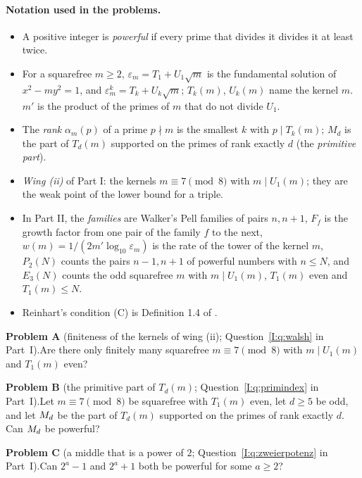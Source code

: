 %
\paragraph{Notation used in the problems.}
\begin{itemize}
\item A positive integer is \emph{powerful} if every prime that divides it divides it at least twice.
\item For a squarefree $m \ge 2$, $\varepsilon_m = T_1 + U_1 \sqrt{m}$ is the fundamental solution of $x^2 - m y^2 = 1$, and $\varepsilon_m^k = T_k + U_k \sqrt{m}$; $T_k(m)$, $U_k(m)$ name the kernel $m$. $m'$ is the product of the primes of $m$ that do not divide $U_1$.
\item The \emph{rank} $\alpha_m(p)$ of a prime $p \nmid m$ is the smallest $k$ with $p \mid T_k(m)$; $M_d$ is the part of $T_d(m)$ supported on the primes of rank exactly $d$ (the \emph{primitive part}).
\item \emph{Wing (ii)} of Part I: the kernels $m \equiv 7 \pmod 8$ with $m \mid U_1(m)$; they are the weak point of the lower bound for a triple.
\item In Part II, the \emph{families} are Walker's Pell families of pairs $n, n + 1$, $F_f$ is the growth factor from one pair of the family $f$ to the next, $w(m) = 1/(2m' \log_{10} \varepsilon_m)$ is the rate of the tower of the kernel $m$, $P_2(N)$ counts the pairs $n - 1, n + 1$ of powerful numbers with $n \le N$, and $E_3(N)$ counts the odd squarefree $m$ with $m \mid U_1(m)$, $T_1(m)$ even and $T_1(m) \le N$.
\item Reinhart's condition (C) is Definition 1.4 of \cite{Reinhart2024}.
\end{itemize}
\par\medskip\noindent\textbf{Problem A} (finiteness of the kernels of wing (ii); Question~\ref{I:q:walsh} in Part~I).\enspace Are there only finitely many squarefree $m \equiv 7 \pmod 8$ with $m \mid U_1(m)$ and $T_1(m)$ even?
\par\medskip\noindent\textbf{Problem B} (the primitive part of $T_d(m)$; Question~\ref{I:q:primindex} in Part~I).\enspace Let $m \equiv 7 \pmod 8$ be squarefree with $T_1(m)$ even, let $d \ge 5$ be odd, and let $M_{d}$ be the part of $T_d(m)$ supported on the primes of rank exactly $d$. Can $M_{d}$ be powerful?
\par\medskip\noindent\textbf{Problem C} (a middle that is a power of $2$; Question~\ref{I:q:zweierpotenz} in Part~I).\enspace Can $2^a - 1$ and $2^a + 1$ both be powerful for some $a \ge 2$?
